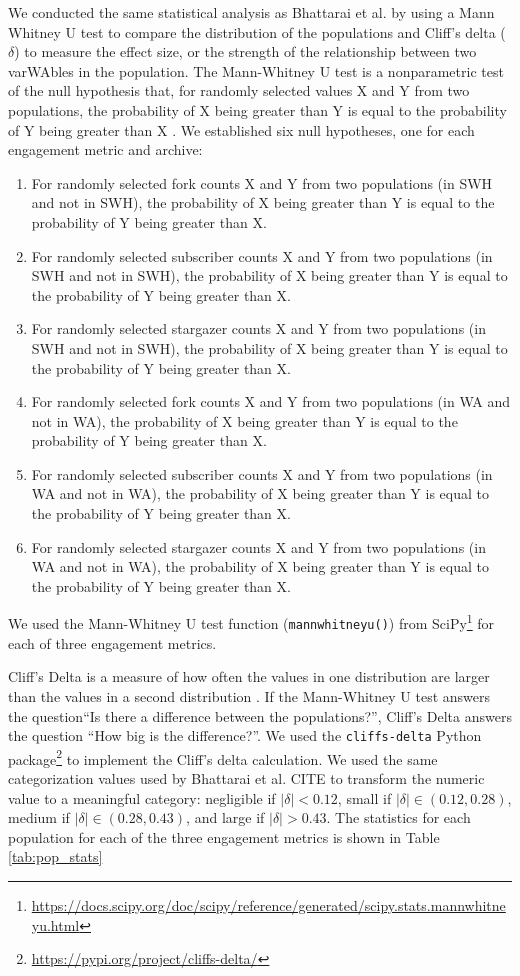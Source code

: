 We conducted the same statistical analysis as Bhattarai et al. \cite{bhattarai-jcdl22} by using a Mann Whitney U test to compare the distribution of the populations and Cliff's delta ($\delta$) to measure the effect size, or the strength of the relationship between two varWAbles in the population. The Mann-Whitney U test is a nonparametric test of the null hypothesis that, for randomly selected values X and Y from two populations, the probability of X being greater than Y is equal to the probability of Y being greater than X \cite{mannwhitney}. We established six null hypotheses, one for each engagement metric and archive:
\begin{enumerate}
\item For randomly selected fork counts X and Y from two populations (in SWH and not in SWH), the probability of X being greater than Y is equal to the probability of Y being greater than X. 
\item For randomly selected subscriber counts X and Y from two populations (in SWH and not in SWH), the probability of X being greater than Y is equal to the probability of Y being greater than X. 
\item For randomly selected stargazer counts X and Y from two populations (in SWH and not in SWH), the probability of X being greater than Y is equal to the probability of Y being greater than X. 
\item For randomly selected fork counts X and Y from two populations (in WA and not in WA), the probability of X being greater than Y is equal to the probability of Y being greater than X. 
\item For randomly selected subscriber counts X and Y from two populations (in WA and not in WA), the probability of X being greater than Y is equal to the probability of Y being greater than X. 
\item For randomly selected stargazer counts X and Y from two populations (in WA and not in WA), the probability of X being greater than Y is equal to the probability of Y being greater than X. 
\end{enumerate}
We used the Mann-Whitney U test function (\verb|mannwhitneyu()|) from SciPy\footnote{\url{https://docs.scipy.org/doc/scipy/reference/generated/scipy.stats.mannwhitneyu.html}} for each of three engagement metrics.

Cliff's Delta is a measure of how often the values in one distribution are larger than the values in a second distribution \cite{cliffsdelta}. If the Mann-Whitney U test answers the question``Is there a difference between the populations?'', Cliff's Delta answers the question ``How big is the difference?''. We used the \verb|cliffs-delta| Python package\footnote{\url{https://pypi.org/project/cliffs-delta/}} to implement the Cliff's delta calculation. We used the same categorization values used by Bhattarai et al. CITE to transform the numeric value to a meaningful category: negligible if $|\delta| < 0.12$, small if $|\delta| \in (0.12, 0.28)$, medium if $|\delta| \in (0.28, 0.43)$, and large if $|\delta| > 0.43$. The statistics for each population for each of the three engagement metrics is shown in Table \ref{tab:pop_stats}

